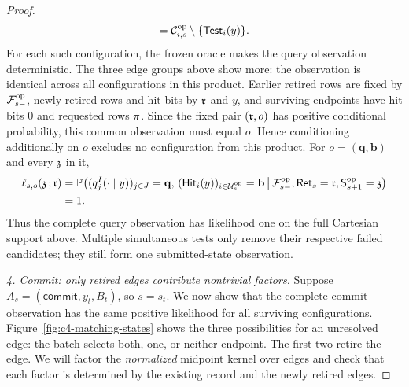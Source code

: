 \begin{proof}
\[ =\OpRemainingTriggers{i}{s}\setminus\{\HardTest{y}{i}\}.
\]
For each such configuration, the frozen oracle makes the query observation
deterministic. The three edge groups above show more: the observation
is identical across all configurations in this product. Earlier retired
rows are fixed by \(\OpAnalyticField{s}\), newly retired rows and hit bits
by \(\RetiredRecordValue\) and \(y\), and surviving endpoints have hit
bits \(0\) and requested rows \(\HardMarginal\).
Since the fixed pair \((\RetiredRecordValue,o)\) has positive conditional
probability, this common observation must equal \(o\).
Hence conditioning additionally on \(o\) excludes no configuration
from this product. For \(o=(\mathbf q,\mathbf b)\) and every
\(\SurvivorConfigA\) in it,
\begin{align*}
 \OpSurvivorLikelihood{s}{o}{\SurvivorConfigA}{\RetiredRecordValue}
 &=\mathbb P\!\left(
     (\HardOracleRow{I}{y}{j})_{j\in J}=\mathbf q,\,
     (\HardHit{y}{i})_{i\in\OpUnresolvedVertices{s}}=\mathbf b
       \,\middle|\,
       \OpAnalyticField{s},\OpRetiredRecord{s}=\RetiredRecordValue,
       \OpSurvivorState{s+1}=\SurvivorConfigA
     \right)\\
 &=1.
\end{align*}
Thus the complete query observation has likelihood one on the full
Cartesian support above. Multiple simultaneous tests only remove their
respective failed candidates; they still form one submitted-state observation.


\emph{4. Commit: only retired edges contribute nontrivial factors.}
Suppose \(A_s=(\mathsf{commit},y_t,B_t)\), so \(s=s_t\).
We now show that the complete commit observation has the same positive
likelihood for all surviving configurations.
Figure~\ref{fig:c4-matching-states} shows the three possibilities for
an unresolved edge: the batch selects both, one, or neither endpoint.
The first two retire the edge. We will factor the \emph{normalized}
midpoint kernel over edges and check that each factor is determined by
the existing record and the newly retired edges.




\end{proof}
